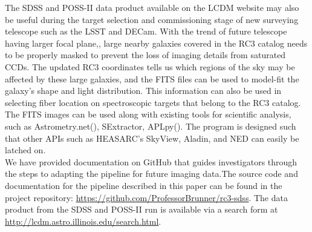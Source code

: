 \documentclass[authoryear, 12pt,5p, times]{elsarticle}
\begin{document}
The SDSS and POSS-II data product available on the LCDM website may also be useful  during  the target selection and commissioning stage of new surveying telescope such as the LSST and DECam. With the trend of future telescope having larger focal plane,, large nearby galaxies covered in the RC3 catalog needs to be properly masked to prevent the loss of imaging details from saturated CCDs. The updated RC3 coordinates tells us  which regions of the sky may be affected by these large galaxies, and the FITS files can be used to model-fit the galaxy's shape and light distribution. This information can also be used in selecting fiber location on spectroscopic targets that belong to the RC3 catalog. The FITS images can be used along with existing tools for scientific analysis, such as Astrometry.net(\citealp{astrometry.net}), SExtractor, APLpy(\citealp{aplpy}). The program is designed such that other APIs such as HEASARC's SkyView, Aladin, and NED can easily be latched on.
\\
\indent We have provided documentation on GitHub  that guides investigators through the steps to adapting the pipeline for future imaging data.The source code and documentation for the pipeline described in this paper can be found in the project repository: \url{https://github.com/ProfessorBrunner/rc3-sdss}. The data product from the SDSS and POSS-II run is available via a search form at \url{http://lcdm.astro.illinois.edu/search.html}.
\end{document}
